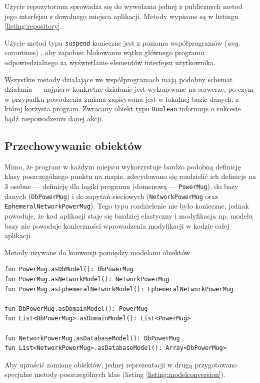 \documentclass[polish,polish,a4paper,12pt]{article}
\begin{document}
	Użycie repozytorium sprowadza się do wywołania jednej z publicznych metod jego interfejsu z dowolnego miejsca aplikacji. Metody wypisane są w listingu \ref{listing:repository}.

	Użycie metod typu \texttt{suspend} konieczne jest z poziomu współprogramów (\textit{ang.} coroutines) \cite{kotlindocs}, aby zapobiec blokowaniu wątku głównego programu odpowiedzialnego za wyświetlanie elementów interfejsu użytkownika.

	Wszystkie metody działające we współprogramach mają podobny schemat działania — najpierw konkretne działanie jest wykonywane na serwerze, po czym w przypadku powodzenia zmiana zapisywana jest w lokalnej bazie danych, z której korzysta program. Zwracany obiekt typu \texttt{Boolean} informuje o sukcesie bądź niepowodzeniu danej akcji.

	\subsection{Przechowywanie obiektów}

	Mimo, że program w każdym miejscu wykorzystuje bardzo podobną definicję klasy poszczególnego punktu na mapie, zdecydowano się rozdzielić ich definicje na 3 osobne — definicję dla logiki programu (domenową — \texttt{PowerMug}), do bazy danych (\texttt{DbPowerMug}) i do zapytań sieciowych (\texttt{NetworkPowerMug} oraz \texttt{EphemeralNetworkPowerMug}). Tego typu rozdzielenie nie było konieczne, jednak powoduje, że kod aplikacji staje się bardziej elastyczny i modyfikacja np. modelu bazy nie powoduje konieczności wprowadzenia modyfikacji w kodzie całej aplikacji.

	\begin{listing}[H]
		\caption{Metody używane do konwersji pomiędzy modelami obiektów}
		\begin{verbatim}
fun PowerMug.asDbModel(): DbPowerMug
fun PowerMug.asNetworkModel(): NetworkPowerMug
fun PowerMug.asEphemeralNetworkModel(): EphemeralNetworkPowerMug

fun DbPowerMug.asDomainModel(): PowerMug
fun List<DbPowerMug>.asDomainModel(): List<PowerMug>

fun NetworkPowerMug.asDatabaseModel(): DbPowerMug
fun List<NetworkPowerMug>.asDatabaseModel(): Array<DbPowerMug>
		\end{verbatim}
		\label{listing:modelconversion}
	\end{listing}

	Aby uprościć zamianę obiektów, jednej reprezentacji w drugą przygotowano specjalne metody poszczególnych klas (listing \ref{listing:modelconversion}).
\end{document}
